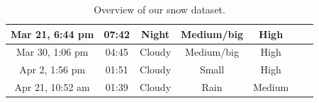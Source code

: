 \begin{table}[htbp]
\begin{tabular}{|c|c|c|c|c|c|c|}
        Mar 21, 6:44 pm    &  07:42            & Night         & Medium/big          & High             &                &                              \\\hline
        Mar 30, 1:06 pm    &  04:45            & Cloudy        & Medium/big          & High             &                &                              \\\hline
        Apr 2, 1:56 pm     &  01:51            & Cloudy        & Small               & High             &                &                              \\\hline
        Apr 21, 10:52 am   &  01:39            & Cloudy        & Rain                & Medium           &                &                              \\\hline
    \end{tabular}
    \caption{Overview of our snow dataset.}
    \label{tab:overview-dataset}
\end{table}

